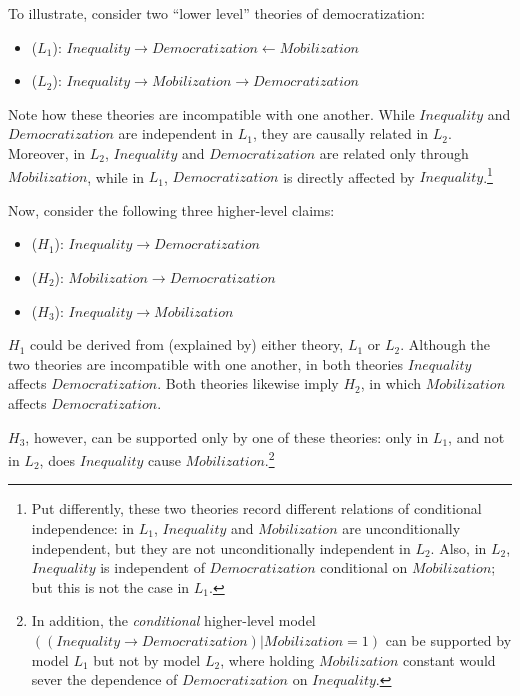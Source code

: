 \documentclass[12pt,]{book}
\providecommand{\tightlist}{%
  \setlength{\itemsep}{0pt}\setlength{\parskip}{0pt}}
\let\rmarkdownfootnote\footnote%
\def\footnote{\protect\rmarkdownfootnote}
\begin{document}
To illustrate, consider two ``lower level'' theories of democratization:

\begin{itemize}
\tightlist
\item
  (\(L_1\)): \(Inequality \rightarrow Democratization \leftarrow Mobilization\)\\
\item
  (\(L_2\)): \(Inequality \rightarrow Mobilization \rightarrow Democratization\)
\end{itemize}

Note how these theories are incompatible with one another. While \(Inequality\) and \(Democratization\) are independent in \(L_1\), they are causally related in \(L_2\). Moreover, in \(L_2\), \(Inequality\) and \(Democratization\) are related only through \(Mobilization\), while in \(L_1\), \(Democratization\) is directly affected by \(Inequality\).\footnote{Put differently, these two theories record different relations of conditional independence: in \(L_1\), \(Inequality\) and \(Mobilization\) are unconditionally independent, but they are not unconditionally independent in \(L_2\). Also, in \(L_2\), \(Inequality\) is independent of \(Democratization\) conditional on \(Mobilization\); but this is not the case in \(L_1\).}

Now, consider the following three higher-level claims:

\begin{itemize}
\tightlist
\item
  (\(H_1\)): \(Inequality \rightarrow Democratization\)
\item
  (\(H_2\)): \(Mobilization \rightarrow Democratization\)
\item
  (\(H_3\)): \(Inequality \rightarrow Mobilization\)
\end{itemize}

\(H_1\) could be derived from (explained by) either theory, \(L_1\) or \(L_2\). Although the two theories are incompatible with one another, in both theories \(Inequality\) affects \(Democratization\). Both theories likewise imply \(H_2\), in which \(Mobilization\) affects \(Democratization\).

\(H_3\), however, can be supported only by one of these theories: only in \(L_1\), and not in \(L_2\), does \(Inequality\) cause \(Mobilization\).\footnote{In addition, the \emph{conditional} higher-level model \(((Inequality \rightarrow Democratization)|Mobilization=1)\) can be supported by model \(L_1\) but not by model \(L_2\), where holding \(Mobilization\) constant would sever the dependence of \(Democratization\) on \(Inequality\).}
\end{document}

